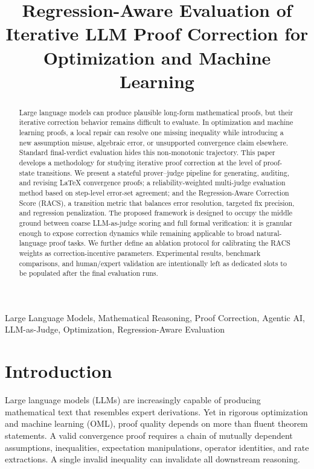 \documentclass[conference]{IEEEtran}
\begin{document}
\title{Regression-Aware Evaluation of Iterative LLM Proof Correction for Optimization and Machine Learning}

\author{
}

\maketitle

\begin{abstract}
Large language models can produce plausible long-form mathematical proofs, but their iterative correction behavior remains difficult to evaluate. In optimization and machine learning proofs, a local repair can resolve one missing inequality while introducing a new assumption misuse, algebraic error, or unsupported convergence claim elsewhere. Standard final-verdict evaluation hides this non-monotonic trajectory. This paper develops a methodology for studying iterative proof correction at the level of proof-state transitions. We present a stateful prover--judge pipeline for generating, auditing, and revising LaTeX convergence proofs; a reliability-weighted multi-judge evaluation method based on step-level error-set agreement; and the Regression-Aware Correction Score (RACS), a transition metric that balances error resolution, targeted fix precision, and regression penalization. The proposed framework is designed to occupy the middle ground between coarse LLM-as-judge scoring and full formal verification: it is granular enough to expose correction dynamics while remaining applicable to broad natural-language proof tasks. We further define an ablation protocol for calibrating the RACS weights as correction-incentive parameters. Experimental results, benchmark comparisons, and human/expert validation are intentionally left as dedicated slots to be populated after the final evaluation runs.
\end{abstract}

\begin{IEEEkeywords}
Large Language Models, Mathematical Reasoning, Proof Correction, Agentic AI, LLM-as-Judge, Optimization, Regression-Aware Evaluation
\end{IEEEkeywords}

\section{Introduction}
Large language models (LLMs) are increasingly capable of producing mathematical text that resembles expert derivations. Yet in rigorous optimization and machine learning (OML), proof quality depends on more than fluent theorem statements. A valid convergence proof requires a chain of mutually dependent assumptions, inequalities, expectation manipulations, operator identities, and rate extractions. A single invalid inequality can invalidate all downstream reasoning.
\end{document}
